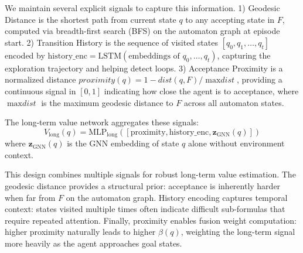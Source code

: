 \documentclass[journal]{IEEEtran}
\begin{document}
We maintain several explicit signals to capture this information. 1) Geodesic Distance is the shortest path from current state $q$ to any accepting state in $F$, computed via breadth-first search (BFS) on the automaton graph at episode start. 2) Transition History is the sequence of visited states $[q_0, q_1, \ldots, q_t]$ encoded by $\text{history\_enc} = \text{LSTM}(\text{embeddings of } q_0, \ldots, q_t)$, capturing the exploration trajectory and helping detect loops. 3) Acceptance Proximity is a normalized distance $\textit{proximity}(q) = 1 - {\textit{dist}(q, F)}/{\max \textit{dist}}$, providing a continuous signal in $[0, 1]$ indicating how close the agent is to acceptance, where $\max \textit{dist}$ is the maximum geodesic distance to $F$ across all automaton states.

The long-term value network aggregates these signals:
\begin{equation}
V_{\text{long}}(q) = \text{MLP}_{\text{long}}([\text{proximity}, \text{history\_enc}, \mathbf{z}_{\text{GNN}}(q)])
\end{equation}
where $\mathbf{z}_{\text{GNN}}(q)$ is the GNN embedding of state $q$ alone without environment context.

This design combines multiple signals for robust long-term value estimation. The geodesic distance provides a structural prior: acceptance is inherently harder when far from $F$ on the automaton graph. History encoding captures temporal context: states visited multiple times often indicate difficult sub-formulas that require repeated attention. Finally, proximity enables fusion weight computation: higher proximity naturally leads to higher $\beta(q)$, weighting the long-term signal more heavily as the agent approaches goal states.

\begin{table}[t]
\centering
\caption{Evaluation Configuration Matrix}
\label{tab:configurations}
\end{table}
\end{document}

